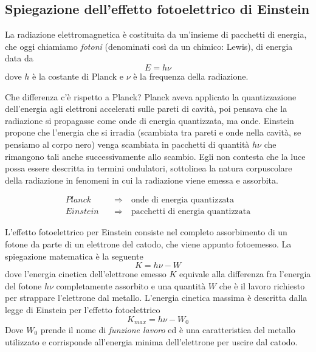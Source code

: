 \subsection{Spiegazione dell'effetto fotoelettrico di Einstein}
La radiazione elettromagnetica è costituita da un'insieme di pacchetti di energia, che oggi chiamiamo \textit{fotoni} (denominati così da un chimico: Lewis), di energia data da
\begin{equation}
E = h \nu
\end{equation}
dove $h$ è la costante di Planck e $\nu$ è la frequenza della radiazione.

Che differenza c'è rispetto a Planck?
Planck aveva applicato la quantizzazione dell'energia agli elettroni accelerati sulle pareti di cavità, poi pensava che la radiazione si propagasse come onde di energia quantizzata, ma onde.
Einstein propone che l'energia che si irradia (scambiata tra pareti e onde nella cavità, se pensiamo al corpo nero) venga scambiata in pacchetti di quantità $h\nu$ che rimangono tali anche successivamente allo scambio.
Egli non contesta che la luce possa essere descritta in termini ondulatori, sottolinea la natura corpuscolare della radiazione in fenomeni in cui la radiazione viene emessa e assorbita.

\begin{equation}
\begin{split}
Planck \quad & \Rightarrow \quad \mbox{onde di energia quantizzata} \\
Einstein \quad & \Rightarrow \quad \mbox{pacchetti di energia quantizzata} 
\end{split}
\end{equation}

L'effetto fotoelettrico per Einstein consiste nel completo assorbimento di un fotone da parte di un elettrone del catodo, che viene appunto fotoemesso.
La spiegazione matematica è la seguente
\begin{equation}
K = h\nu - W
\end{equation}
dove l'energia cinetica dell'elettrone emesso $K$ equivale alla differenza fra l'energia del fotone $h\nu$ completamente assorbito e una quantità $W$ che è il lavoro richiesto per strappare l'elettrone dal metallo.
L'energia cinetica massima è descritta dalla legge di Einstein per l'effetto fotoelettrico
\begin{equation}
K_{max} = h\nu - W_0
\end{equation}
Dove $W_0$ prende il nome di \textit{funzione lavoro} ed è una caratteristica del metallo utilizzato e corrisponde all'energia minima dell'elettrone per uscire dal catodo.

